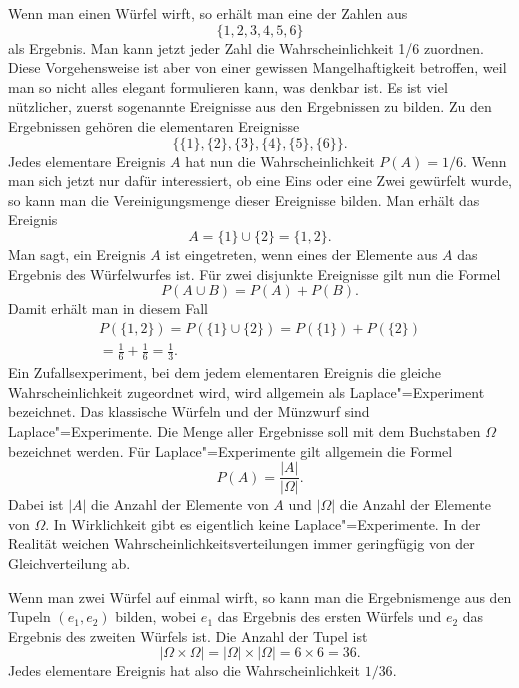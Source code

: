 \documentclass[a4paper,10pt,fleqn,twocolumn,twoside]{article}
\numberwithin{equation}{section}
\begin{document}
Wenn man einen Würfel wirft, so erhält man eine der Zahlen aus
\begin{equation}
\{1,2,3,4,5,6\}
\end{equation}
als Ergebnis. Man kann jetzt jeder Zahl die Wahrscheinlichkeit 1/6
zuordnen. Diese Vorgehensweise ist aber von einer gewissen
Mangelhaftigkeit betroffen, weil man so nicht alles elegant
formulieren kann, was denkbar ist. Es ist viel nützlicher, zuerst
sogenannte Ereignisse aus den Ergebnissen zu bilden. Zu den
Ergebnissen gehören die elementaren Ereignisse
\begin{equation}
\{\{1\},\{2\},\{3\},\{4\},\{5\},\{6\}\}.
\end{equation}
Jedes elementare Ereignis $A$ hat nun die Wahrscheinlichkeit
$P(A)=1/6$. Wenn man sich jetzt nur dafür interessiert, ob eine
Eins oder eine Zwei gewürfelt wurde, so kann man die Vereinigungsmenge
dieser Ereignisse bilden. Man erhält das Ereignis
\begin{equation}
A = \{1\}\cup\{2\} = \{1,2\}.
\end{equation}
Man sagt, ein Ereignis $A$ ist eingetreten, wenn eines der Elemente
aus $A$ das Ergebnis des Würfelwurfes ist. Für zwei disjunkte
Ereignisse gilt nun die Formel
\begin{equation}
P(A\cup B) = P(A)+P(B).
\end{equation}
Damit erhält man in diesem Fall
\begin{gather*}
P(\{1,2\})=P(\{1\}\cup\{2\})=P(\{1\})+P(\{2\})\\
= \frac{1}{6}+\frac{1}{6} = \frac{1}{3}.
\end{gather*}
Ein Zufallsexperiment, bei dem jedem elementaren Ereignis die
gleiche Wahrscheinlichkeit zugeordnet wird, wird allgemein als
Laplace"=Experiment bezeichnet. Das klassische Würfeln und der
Münzwurf sind Laplace"=Experimente. Die Menge aller Ergebnisse
soll mit dem Buchstaben $\Omega$ bezeichnet werden.
Für Laplace"=Experimente gilt allgemein die Formel
\begin{equation}
P(A) = \frac{|A|}{|\Omega|}.
\end{equation}
Dabei ist $|A|$ die Anzahl der Elemente von $A$ und $|\Omega|$
die Anzahl der Elemente von $\Omega$. In Wirklichkeit gibt es
eigentlich keine Laplace"=Experimente. In der Realität weichen
Wahrscheinlichkeitsverteilungen immer geringfügig von der
Gleichverteilung ab.

Wenn man zwei Würfel auf einmal wirft, so kann man die Ergebnismenge
aus den Tupeln $(e_1,e_2)$ bilden, wobei $e_1$ das Ergebnis des
ersten Würfels und $e_2$ das Ergebnis des zweiten Würfels ist.
Die Anzahl der Tupel ist
\begin{equation}
|\Omega\times\Omega| = |\Omega|\times|\Omega| = 6\times 6 = 36.
\end{equation}
Jedes elementare Ereignis hat also die Wahrscheinlichkeit $1/36$.
\end{document}
